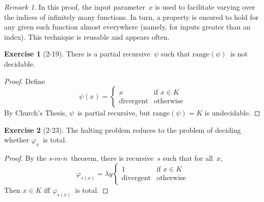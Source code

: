 \documentclass[letterpaper]{article}
\newcommand{\ran}{\mathrm{range}}
\newcommand{\smn}{$s$-$m$-$n$}
\theoremstyle{definition}
\newtheorem*{exer}{Exercise}
\theoremstyle{remark}
\newtheorem*{rmk}{Remark}
\theoremstyle{direction}
\begin{document}
\begin{rmk}
In this proof, the input parameter~$x$ is used to facilitate varying over the indices of infinitely many functions. In turn, a property is ensured to hold for any given such function almost everywhere (namely, for inputs greater than an index). This technique is reusable and appears often.
\end{rmk}

\begin{exer}[2-19]
There is a partial recursive~$\psi$ such that $\ran(\psi)$~is not decidable.
\end{exer}
\begin{proof}
Define
$$\psi(x)=\begin{cases}
x&\text{if }x\in K\\
\text{divergent}&\text{otherwise}
\end{cases}$$
By Church's Thesis, $\psi$~is partial recursive, but $\ran(\psi)=K$ is undecidable.
\end{proof}

\begin{exer}[2-23]
The halting problem reduces to the problem of deciding whether $\varphi_x$~is total.
\end{exer}
\begin{proof}
By the \smn\ theorem, there is recursive~$s$ such that for all~$x$,
$$\varphi_{s(x)}=\lambda y\begin{cases}
1&\text{if }x\in K\\
\text{divergent}&\text{otherwise}
\end{cases}$$
Then $x\in K$ iff $\varphi_{s(x)}$~is total.
\end{proof}
\end{document}
